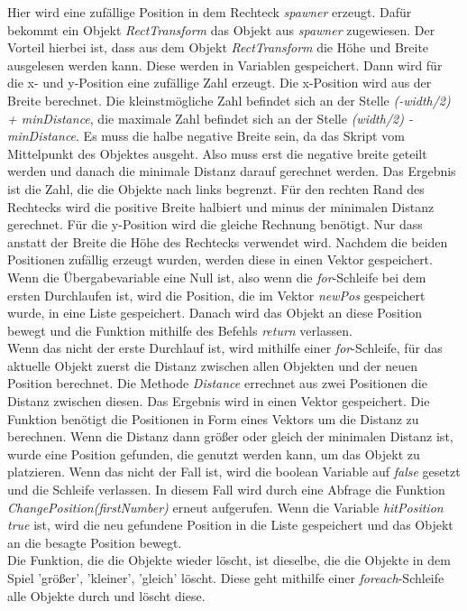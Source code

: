 Hier wird eine zufällige Position in dem Rechteck \textit{spawner} erzeugt. Dafür bekommt ein Objekt \textit{RectTransform} das Objekt aus \textit{spawner} zugewiesen. Der Vorteil hierbei ist, dass aus dem Objekt \textit{RectTransform} die Höhe und Breite ausgelesen werden kann. Diese werden in Variablen gespeichert. Dann wird für die x- und y-Position eine zufällige Zahl erzeugt. Die x-Position wird aus der Breite berechnet. Die kleinstmögliche  Zahl befindet sich an der Stelle \textit{(-width/2) + minDistance}, die maximale Zahl befindet sich an der Stelle \textit{(width/2) - minDistance}. Es muss die halbe negative Breite sein, da das Skript vom Mittelpunkt des Objektes ausgeht. Also muss erst die negative breite geteilt werden und danach die minimale Distanz darauf gerechnet werden. Das Ergebnis ist die Zahl, die die Objekte nach links begrenzt. Für den rechten Rand des Rechtecks wird die positive Breite halbiert und minus der minimalen Distanz gerechnet. Für die y-Position wird die gleiche Rechnung benötigt. Nur dass anstatt der Breite die Höhe des Rechtecks verwendet wird. Nachdem die beiden Positionen zufällig erzeugt wurden, werden diese in einen Vektor gespeichert. Wenn die Übergabevariable eine Null ist, also wenn die \textit{for}-Schleife bei dem ersten Durchlaufen ist, wird die Position, die im Vektor \textit{newPos} gespeichert wurde, in eine Liste gespeichert. Danach wird das Objekt an diese Position bewegt und die Funktion mithilfe des Befehls \textit{return} verlassen.\\
Wenn das nicht der erste Durchlauf ist, wird mithilfe einer \textit{for}-Schleife, für das aktuelle Objekt zuerst die Distanz zwischen allen Objekten und der neuen Position berechnet.
Die Methode \textit{Distance} errechnet aus zwei Positionen die Distanz zwischen diesen. Das Ergebnis wird in einen Vektor gespeichert. Die Funktion benötigt die Positionen in Form eines Vektors um die Distanz zu berechnen. Wenn die Distanz dann größer oder gleich der minimalen Distanz ist, wurde eine Position gefunden, die genutzt werden kann, um das Objekt zu platzieren. Wenn das nicht der Fall ist, wird die boolean Variable auf \textit{false} gesetzt und die Schleife verlassen. In diesem Fall wird durch eine Abfrage die Funktion \textit{ChangePosition(firstNumber)} erneut aufgerufen. Wenn die Variable \textit{hitPosition} \textit{true} ist, wird die neu gefundene Position in die Liste gespeichert und das Objekt an die besagte Position bewegt.\\
Die Funktion, die die Objekte wieder löscht, ist dieselbe, die die Objekte in dem Spiel 'größer', 'kleiner', 'gleich' löscht. Diese geht mithilfe einer \textit{foreach}-Schleife alle Objekte durch und löscht diese.\\
